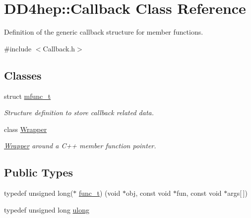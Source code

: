\hypertarget{class_d_d4hep_1_1_callback}{}\section{D\+D4hep\+:\+:Callback Class Reference}
\label{class_d_d4hep_1_1_callback}


Definition of the generic callback structure for member functions.  




{\ttfamily \#include $<$Callback.\+h$>$}

\subsection*{Classes}
\begin{DoxyCompactItemize}
\item 
struct \hyperlink{struct_d_d4hep_1_1_callback_1_1mfunc__t}{mfunc\+\_\+t}
\begin{DoxyCompactList}\small\item\em Structure definition to store callback related data. \end{DoxyCompactList}\item 
class \hyperlink{class_d_d4hep_1_1_callback_1_1_wrapper}{Wrapper}
\begin{DoxyCompactList}\small\item\em \hyperlink{class_d_d4hep_1_1_callback_1_1_wrapper}{Wrapper} around a C++ member function pointer. \end{DoxyCompactList}\end{DoxyCompactItemize}
\subsection*{Public Types}
\begin{DoxyCompactItemize}
\item 
typedef unsigned long($\ast$ \hyperlink{class_d_d4hep_1_1_callback_a1f07e4c890067fde0b3ff1ad94e72a34}{func\+\_\+t}) (void $\ast$obj, const void $\ast$fun, const void $\ast$args\mbox{[}$\,$\mbox{]})
\item 
typedef unsigned long \hyperlink{class_d_d4hep_1_1_callback_ac676aa0685e2ba51bac69c33f8066431}{ulong}
\end{DoxyCompactItemize}
